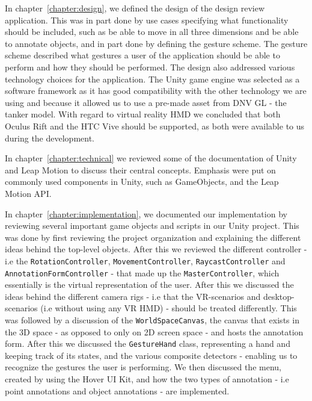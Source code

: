In chapter~\ref{chapter:design}, we defined the design of the design review application. This was in part done by use cases specifying what functionality should 
be included, such as be able to move in all three dimensions and be able to annotate objects, and in part done by defining the gesture scheme. The gesture scheme
described what gestures a user of the application should be able to perform and how they should be performed. The design also addressed various technology 
choices for the application. The Unity game engine was selected as a software framework as it has good compatibility with the other technology we are using and 
because it allowed us to use a pre-made asset from DNV GL - the tanker model. With regard to virtual reality HMD we concluded that both Oculus Rift and the 
HTC Vive should be supported, as both were available to us during the development.

In chapter~\ref{chapter:technical} we reviewed some of the documentation of Unity and Leap Motion to discuss their central concepts. 
Emphasis were put on commonly used components in Unity, such as GameObjects, and the Leap Motion API.

In chapter~\ref{chapter:implementation}, we documented our implementation by reviewing several important game objects and scripts in our Unity project. 
This was done by first reviewing the project organization and explaining the different ideas behind the top-level objects. 
After this we reviewed the different controller - i.e the \texttt{Rotation\-Controller}, \texttt{Movement\-Controller}, \texttt{Raycast\-Controller} and 
\texttt{Annotation\-Form\-Controller} - that made up the \texttt{MasterController}, which essentially is the virtual representation of the user. 
After this we discussed the ideas behind the different camera rigs - i.e that the VR-scenarios and desktop-scenarios (i.e without using any VR HMD) - should
be treated differently. This was followed by a discussion of the \texttt{World\-Space\-Canvas}, the canvas that exists in the 3D space - as opposed to only 
on 2D screen space - and hosts the annotation form. After this we discussed the \texttt{GestureHand} class, representing a hand and keeping track of its states, 
and the various composite detectors - enabling us to recognize the gestures the user is performing. We then discussed the menu, created by using the Hover UI Kit,
and how the two types of annotation - i.e point annotations and object annotations - are implemented. 

